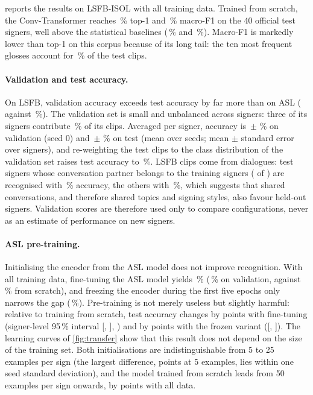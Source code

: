  reports the results on LSFB-ISOL with all training data. Trained from scratch,
the Conv-Transformer reaches \numLsfbScratchTest{}\,\% top-1 and \numLsfbScratchTestFOne{}\,\%
macro-F1 on the 40 official test signers, well above the statistical baselines (\numLsfbLogregTest{}\,\% and
\numLsfbLogregTestFOne{}\,\%). Macro-F1 is markedly lower than top-1 on this corpus because of its long tail: the ten
most frequent glosses account for \numLsfbTopTenShare{}\,\% of the test clips.

\paragraph{Validation and test accuracy.}
On LSFB, validation accuracy exceeds test accuracy by far more than on ASL (\numGapValClip{} against
\numGapTestClip{}\,\%). The validation set is small and unbalanced across signers: three of its
\numGapValSigners{} signers contribute \numGapTopThreeShare{}\,\% of its clips. Averaged per signer,
accuracy is \numGapValPerSigner{}\,$\pm$\,\numGapValPerSignerSem{}\,\% on validation (seed 0) and
\numGapTestPerSigner{}\,$\pm$\,\numGapTestPerSignerSem{}\,\% on test (mean over seeds; mean $\pm$
standard error over signers), and re-weighting the test clips to the class distribution of the validation set raises
test accuracy to \numGapTestReweighted{}\,\%. LSFB clips come from dialogues: test signers whose
conversation partner belongs to the training signers (\numGapTestPartnerInN{} of
\numGapTestSigners{}) are recognised with \numGapTestPartnerIn{}\,\% accuracy, the others with
\numGapTestPartnerOut{}\,\%, which suggests that shared conversations, and therefore shared topics
and signing styles, also favour held-out signers. Validation scores are therefore used only to
compare configurations, never as an estimate of performance on new signers.

\paragraph{ASL pre-training.}
Initialising the encoder from the ASL model does not improve recognition. With all training data,
fine-tuning the ASL model yields \numLsfbFtTest{}\,\% (\numLsfbFtVal{}\,\% on validation, against
\numLsfbScratchVal{}\,\% from scratch), and freezing the encoder during the first five epochs only
narrows the gap (\numLsfbFreezeTest{}\,\%). Pre-training is not merely useless but slightly harmful: relative to training from scratch,
test accuracy changes by \numLsfbFtDiff{} points with fine-tuning (signer-level 95\,\% interval
[\numLsfbFtCiLo{}, \numLsfbFtCiHi{}], \numLsfbFtP{}) and by \numLsfbFreezeDiff{} points with the
frozen variant ([\numLsfbFreezeCiLo{}, \numLsfbFreezeCiHi{}]). The learning curves of \cref{fig:transfer} show that
this result does not depend on the size of the training set. Both initialisations are
indistinguishable from 5 to 25 examples per sign (the largest difference, \numGainFew{} points at
5 examples, lies within one seed standard deviation), and the model trained from scratch leads
from 50 examples per sign onwards, by \numScratchLeadAll{} points with all data.

